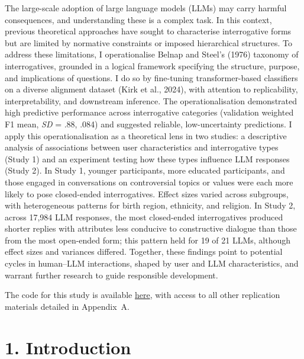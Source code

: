 \documentclass[
  12pt,
]{article}
\begin{document}
\noindent\hspace*{2em}The large-scale adoption of large language models (LLMs) may carry harmful consequences, and understanding these is a complex task. In this context, previous theoretical approaches have sought to characterise interrogative forms but are limited by normative constraints or imposed hierarchical structures. To address these limitations, I operationalise Belnap and Steel's (1976) taxonomy of interrogatives, grounded in a logical framework specifying the structure, purpose, and implications of questions. I do so by fine-tuning transformer-based classifiers on a diverse alignment dataset (Kirk et al., 2024), with attention to replicability, interpretability, and downstream inference. The operationalisation demonstrated high predictive performance across interrogative categories (validation weighted F1 mean, \emph{SD} = .88, .084) and suggested reliable, low-uncertainty predictions. I apply this operationalisation as a theoretical lens in two studies: a descriptive analysis of associations between user characteristics and interrogative types (Study 1) and an experiment testing how these types influence LLM responses (Study 2). In Study 1, younger participants, more educated participants, and those engaged in conversations on controversial topics or values were each more likely to pose closed-ended interrogatives. Effect sizes varied across subgroups, with heterogeneous patterns for birth region, ethnicity, and religion. In Study 2, across 17,984 LLM responses, the most closed-ended interrogatives produced shorter replies with attributes less conducive to constructive dialogue than those from the most open-ended form; this pattern held for 19 of 21 LLMs, although effect sizes and variances differed. Together, these findings point to potential cycles in human--LLM interactions, shaped by user and LLM characteristics, and warrant further research to guide responsible development.

\begin{center}
The code for this study is available \href{https://github.com/50280/MY498-ASDS}{here}, with access to all other replication materials detailed in Appendix~A.
\end{center}

\clearpage

\section{1. Introduction}\label{introduction}
\end{document}
